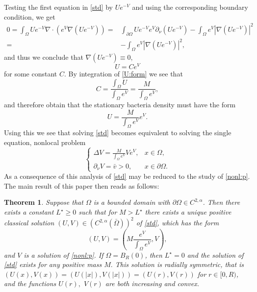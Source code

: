 \documentclass[12pt,a4paper]{amsart}
\newtheorem{theorem}{Theorem}
\theoremstyle{definition}
\theoremstyle{remark}
\numberwithin{equation}{section}
\numberwithin{theorem}{section}
\begin{document}
Testing the first equation in \eqref{std} by $Ue^{-V}$ and using the corresponding boundary condition, we get
\begin{align*}
0=\int_\Omega Ue^{-V}\nabla\cdot(e^V\nabla (Ue^{-V}))=&\int_{\partial\Omega}Ue^{-V}e^V\partial_\nu (Ue^{-V})-\int_\Omega e^{V}|\nabla(Ue^{-V})|^2\\
=&-\int_\Omega e^{V}|\nabla(Ue^{-V})|^2,
\end{align*}    
and thus we conclude that $\nabla (Ue^{-V})\equiv 0$, 
\begin{equation}\label{U:form}
U=Ce^V
\end{equation} 
for some constant $C$. 
 By integration of \eqref{U:form} we see that
$$
C=\frac{\int_\Omega U}{\int_\Omega e^V}=\frac{M}{\int_\Omega e^V},
$$   
and therefore obtain that the stationary bacteria density must have the form
\begin{equation}\label{U:gen:fo}
U=\frac{M}{\int_\Omega e^V}e^V.
\end{equation}
Using this we see that solving \eqref{std} becomes equivalent to solving the single equation, nonlocal problem
\begin{equation}\label{nonl:p}
\left\{\begin{array}{lr}
\Delta V=\frac{M}{\int_\Omega e^V}Ve^V,& x\in\Omega,\\
\partial_\nu V=\bar{v}>0,& x\in\partial\Omega.
\end{array}\right. 
\end{equation}
As a consequence of this analysis of \eqref{std} may be reduced to the study of \eqref{nonl:p}.  
The main result of this paper then reads as follows:

\begin{theorem}\label{MainR}
Suppose that $\Omega$ is a bounded domain with $\partial\Omega\in C^{2,\alpha}$. Then there exists a constant $L^\star\geq 0$ such that for $M>L^\star$ there exists a unique positive classical solution $(U,V)\in (C^{2,\alpha}(\bar{\Omega}))^2$ of \eqref{std}, which has the form
\begin{equation}\label{eqiv:rel}
(U,V)=\left(M\frac{e^V}{\int_\Omega e^V},V\right),
\end{equation}
and $V$ is a solution of \eqref{nonl:p}.	 If $\Omega=B_R(0)$, then $L^\star =0$ and the solution of \eqref{std} exists for any positive mass $M.$ This solution is radially symmetric, that is $(U(x),V(x))=(U(|x|),V(|x|))=(U(r),V(r))$ for $r\in[0,R)$, and the functions $U(r),$ $V(r)$ are both increasing and convex. 
\end{theorem}
\end{document}
